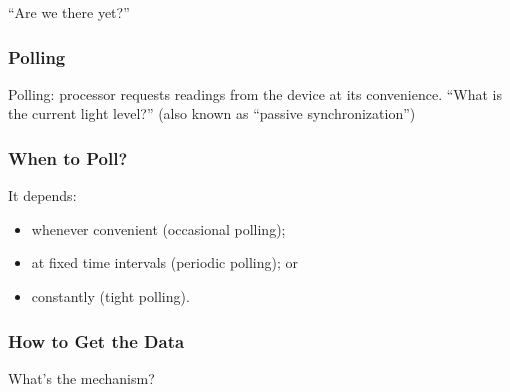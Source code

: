 \documentclass[aspectratio=169]{beamer}
\begin{document}
\begin{frame}

\Huge
\begin{center}
``Are we there yet?''
\end{center}


\end{frame}

\begin{frame}
\frametitle{Polling}

\Large
Polling: processor requests readings from
the device at its convenience.  \vfill
``What is the current light level?''\vfill
(also known as ``passive synchronization'')

\end{frame}

\begin{frame}
\frametitle{When to Poll?}

\large
It depends:

\begin{itemize}
\item whenever convenient (occasional polling);
\item at fixed time intervals (periodic polling); or
\item constantly (tight polling).
\end{itemize}


\end{frame}

\begin{frame}
\frametitle{How to Get the Data}

\begin{center}
\end{center}

\large 
\vspace*{1em} What's the mechanism?



\end{frame}
\end{document}
